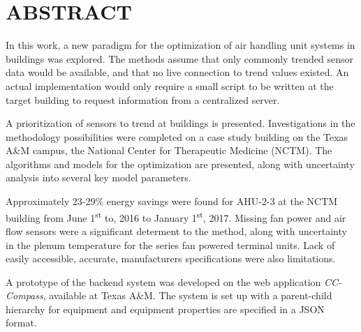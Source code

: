 %
%
%

\chapter*{\texorpdfstring{\MakeUppercase{ABSTRACT}}{ABSTRACT}}

\pagestyle{plain} %
\setcounter{page}{2}

\indent  In this work, a new paradigm for the optimization of air
handling unit systems in buildings was explored. The methods assume
that only commonly trended sensor data would be available, and that no
live connection to trend values existed. An actual implementation would
only require a small script to be written at the target building to
request information from a centralized server. 

A prioritization of sensors to trend at buildings is presented.
Investigations in the methodology possibilities were completed on a case study
building on the Texas A\&M campus, the National Center for Therapeutic
Medicine (NCTM). The algorithms and models for the optimization are
presented, along with uncertainty analysis into several key model
parameters. 

Approximately 23-29\% energy savings were found for AHU-2-3 at the NCTM
building from June 1\textsuperscript{st} to, 2016 to January
1\textsuperscript{st}, 2017.  Missing fan power and air flow sensors were a significant
determent to the method, along with uncertainty in the plenum
temperature for the series fan powered terminal units. Lack of easily
accessible, accurate, manufacturers specifications were also
limitations.  

A prototype of the backend system was developed on the web application
\textit{CC-Compass}, available at Texas A\&M. The system is set up with
a parent-child hierarchy for equipment and equipment properties are
specified in a JSON format. 
 

\pagebreak{}
